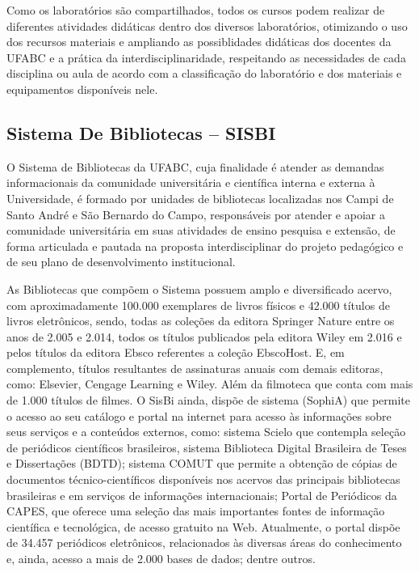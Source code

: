 \documentclass{article}
\begin{document}
Como os laboratórios são compartilhados, todos os cursos podem realizar de diferentes atividades didáticas dentro dos diversos laboratórios, otimizando o uso dos recursos materiais e ampliando as possiblidades didáticas dos docentes da UFABC e a prática da interdisciplinaridade, respeitando as necessidades de cada disciplina ou aula de acordo com a classificação do laboratório e dos materiais e equipamentos disponíveis nele.

\subsection{Sistema De Bibliotecas – SISBI}

O Sistema de Bibliotecas da UFABC, cuja finalidade é atender as demandas informacionais da comunidade universitária e científica interna e externa à Universidade, é formado por unidades de bibliotecas localizadas nos Campi de Santo André e São Bernardo do Campo, responsáveis por atender e apoiar a comunidade universitária em suas atividades de ensino pesquisa e extensão, de forma articulada e pautada na proposta interdisciplinar do projeto pedagógico e de seu plano de desenvolvimento institucional.

As Bibliotecas que compõem o Sistema possuem amplo e diversificado acervo, com aproximadamente 100.000 exemplares de livros físicos e 42.000 títulos de livros eletrônicos, sendo, todas as coleções da editora Springer Nature entre os anos de 2.005 e 2.014, todos os títulos publicados pela editora Wiley em 2.016 e pelos títulos da editora Ebsco referentes a coleção EbscoHost. E, em complemento, títulos resultantes de assinaturas anuais com demais editoras, como: Elsevier, Cengage Learning e Wiley. Além da filmoteca que conta com mais de 1.000 títulos de filmes.
O SisBi ainda, dispõe de sistema (SophiA) que permite o acesso ao seu catálogo e portal na internet para acesso às informações sobre seus serviços e a conteúdos externos, como: sistema Scielo que contempla seleção de periódicos científicos brasileiros, sistema Biblioteca Digital Brasileira de Teses e Dissertações (BDTD); sistema COMUT que permite a obtenção de cópias de documentos técnico-científicos disponíveis nos acervos das principais bibliotecas brasileiras e em serviços de informações internacionais; Portal de Periódicos da CAPES, que oferece uma seleção das mais importantes fontes de informação científica e tecnológica, de acesso gratuito na Web. Atualmente, o portal dispõe de 34.457 periódicos eletrônicos, relacionados às diversas áreas do conhecimento e, ainda, acesso a mais de 2.000 bases de dados; dentre outros.
\end{document}
